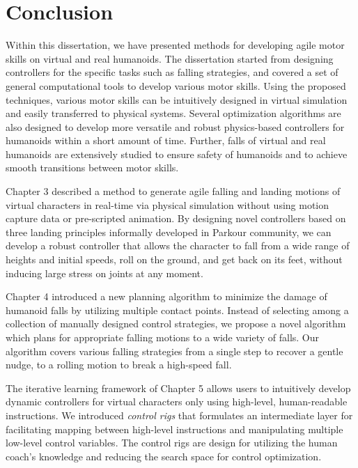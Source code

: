 \chapter{Conclusion}

Within this dissertation, we have presented methods for developing agile motor
skills on virtual and real humanoids.
The dissertation started from designing controllers for the specific tasks
such as falling strategies,
and covered a set of general computational tools to develop
various motor skills.
Using the proposed techniques, various motor skills can be intuitively designed
in virtual simulation and easily transferred to physical systems.
Several optimization algorithms are also designed to develop more versatile and
robust physics-based controllers for humanoids within a short amount of time.
Further, falls of virtual and real humanoids are extensively studied to
ensure safety of humanoids and to achieve smooth transitions between motor
skills.

Chapter 3 described a method to generate agile falling and landing motions of
virtual characters in real-time via physical simulation
without using motion capture data or pre-scripted animation.
By designing novel controllers based on three landing principles informally
developed in Parkour community, we can develop a robust controller that
allows the character to fall from a wide range of heights and initial speeds,
roll on the ground, and get back on its feet, without inducing large stress on
joints at any moment.

Chapter 4 introduced a new planning algorithm to minimize the damage
of humanoid falls by utilizing multiple contact points.
Instead of selecting among a collection of manually designed control
strategies, we propose a novel algorithm which plans for appropriate
falling motions to a wide variety of falls.
Our algorithm covers various falling strategies from a single step to recover a
gentle nudge, to a rolling motion to break a high-speed fall.

The iterative learning framework of Chapter 5 allows users to intuitively
develop dynamic controllers for virtual characters only using high-level,
human-readable instructions.
We introduced \emph{control rigs} that
formulates an intermediate layer 
for facilitating mapping between high-level instructions and manipulating
multiple low-level control variables.
The control rigs are design for utilizing the human coach's knowledge and 
reducing the search space for control optimization.


